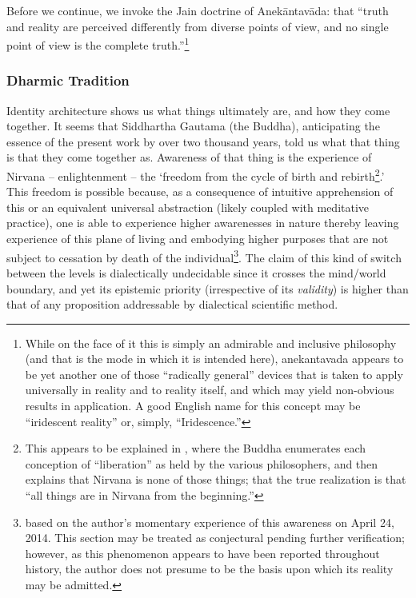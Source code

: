 \documentclass[pra,twocolumn,groupedaddress,10pt]{revtex4}
\theoremstyle{definition}
\begin{document}
Before we continue, we invoke the Jain doctrine of Anek\={a}ntav\={a}da: that ``truth and reality are perceived differently from diverse points of view, and no single point of view is the complete truth.''\footnote{While on the face of it this is simply an admirable and inclusive philosophy (and that is the mode in which it is intended here), anekantavada appears to be yet another one of those ``radically general'' devices that is taken to apply universally in reality and to reality itself, and which may yield non-obvious results in application. A good English name for this concept may be ``iridescent reality'' or, simply, ``Iridescence.''}\cite{anekantavada}

\subsubsection{Dharmic Tradition} \label{sec:dhatra}

Identity architecture shows us what things ultimately are, and how they come together. It seems that Siddhartha Gautama (the Buddha), anticipating the essence of the present work by over two thousand years, told us what that thing is that they come together as. Awareness of that thing is the experience of Nirvana -- enlightenment -- the `freedom from the cycle of birth and rebirth\footnote{This appears to be explained in \cite{lankavatara}, where the Buddha enumerates each conception of ``liberation'' as held by the various philosophers, and then explains that Nirvana is none of those things; that the true realization is that ``all things are in Nirvana from the beginning.''}.' This freedom is possible because, as a consequence of intuitive apprehension of this or an equivalent universal abstraction (likely coupled with meditative practice), one is able to experience higher awarenesses in nature thereby leaving experience of this plane of living and embodying higher purposes that are not subject to cessation by death of the individual\footnote{based on the author's momentary experience of this awareness on April 24, 2014. This section may be treated as conjectural pending further verification; however, as this phenomenon appears to have been reported throughout history, the author does not presume to be the basis upon which its reality may be admitted.}. The claim of this kind of switch between the levels is dialectically undecidable since it crosses the mind/world boundary, and yet its epistemic priority (irrespective of its \textit{validity}) is higher than that of any proposition addressable by dialectical scientific method.
\end{document}
